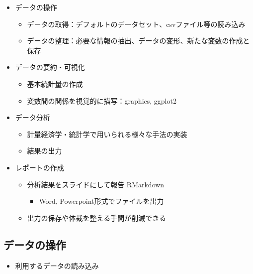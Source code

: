 \documentclass[
]{ltjsarticle}
\providecommand{\tightlist}{%
  \setlength{\itemsep}{0pt}\setlength{\parskip}{0pt}}
\begin{document}
\begin{itemize}
\item
  データの操作

  \begin{itemize}
  \tightlist
  \item
    データの取得：デフォルトのデータセット、csvファイル等の読み込み
  \item
    データの整理：必要な情報の抽出、データの変形、新たな変数の作成と保存
  \end{itemize}
\item
  データの要約・可視化

  \begin{itemize}
  \tightlist
  \item
    基本統計量の作成
  \item
    変数間の関係を視覚的に描写：graphics, ggplot2
  \end{itemize}
\item
  データ分析

  \begin{itemize}
  \tightlist
  \item
    計量経済学・統計学で用いられる様々な手法の実装
  \item
    結果の出力
  \end{itemize}
\item
  レポートの作成

  \begin{itemize}
  \item
    分析結果をスライドにして報告 RMarkdown

    \begin{itemize}
    \tightlist
    \item
      Word, Powerpoint形式でファイルを出力
    \end{itemize}
  \item
    出力の保存や体裁を整える手間が削減できる
  \end{itemize}
\end{itemize}

\hypertarget{ux30c7ux30fcux30bfux306eux64cdux4f5c}{%
\subsection{データの操作}\label{ux30c7ux30fcux30bfux306eux64cdux4f5c}}

\begin{itemize}
\tightlist
\item
  利用するデータの読み込み
\end{itemize}
\end{document}
